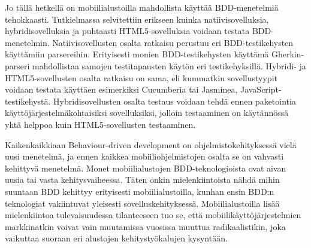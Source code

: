 \documentclass[finnish,nonumbib,nocopyright]{gradu2}
\begin{document}
Jo tällä hetkellä on mobiilialustoilla mahdollista käyttää BDD-menetelmiä tehokkaasti. Tutkielmassa selvitettiin erikseen kuinka natiivisovelluksia, hybridisovelluksia ja puhtaasti HTML5-sovelluksia voidaan testata BDD-menetelmin. Natiivisovellusten osalta ratkaisu perustuu eri BDD-testikehysten käyttämiin parsereihin. Erityisesti monien BDD-testikehysten käyttämä Gherkin-parseri mahdollistaa samojen testitapausten käytön eri testikehyksillä. Hybridi- ja HTML5-sovellusten osalta ratkaisu on sama, eli kummatkin sovellustyypit voidaan testata käyttäen esimerkiksi Cucumberia tai Jasminea, JavaScript-testikehystä. Hybridisovellusten osalta testaus voidaan tehdä ennen paketointia käyttöjärjestelmäkohtaisiksi sovelluksiksi, jolloin testaaminen on käytännössä yhtä helppoa kuin HTML5-sovellusten testaaminen.

Kaikenkaikkiaan Behaviour-driven development on ohjelmistokehityksessä vielä uusi menetelmä, ja ennen kaikkea mobiiliohjelmistojen osalta se on vahvasti kehittyvä menetelmä. Monet mobiilialustojen BDD-teknologioista ovat aivan uusia tai vasta kehitysvaiheessa. Täten onkin mielenkiintoista nähdä mihin suuntaan BDD kehittyy erityisesti mobiilialustoilla, kunhan ensin BDD:n teknologiat vakiintuvat yleisesti sovelluskehityksessä. Mobiilialustoilla lisää mielenkiintoa tulevaisuudessa tilanteeseen tuo se, että mobiilikäyttöjärjestelmien markkinatkin voivat vain muutamissa vuosissa muuttua radikaalistikin, joka vaikuttaa suoraan eri alustojen kehitystyökalujen kysyntään.
\end{document}
